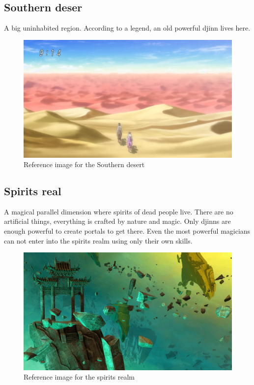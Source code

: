 \subsection{Southern deser}
A big uninhabited region. According to a legend, an old powerful djinn lives here.
\begin{figure}[H]
  \centering
  \includegraphics[width=12cm]{../Images/Locations/southernDesert}
  \caption{Reference image for the Southern desert}
\end{figure}

\subsection{Spirits real}
A magical parallel dimension where spirits of dead people live. There are no artificial things, everything is crafted by nature and magic. Only djinns are enough powerful to create portals to get there. Even the most powerful magicians can not enter into the spirits realm using only their own skills.
\begin{figure}[H]
  \centering
  \includegraphics[width=12cm]{../Images/Locations/spiritsRealm}
  \caption{Reference image for the spirits realm}
\end{figure}

